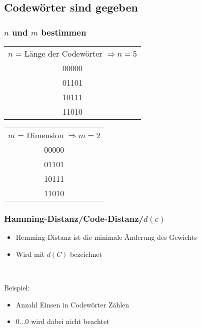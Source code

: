 \subsection{Codewörter sind gegeben}

\subsubsection*{$n$ und $m$ bestimmen}

\begin{table}[h]
\centering
\begin{tabular}{c}
$n$ = Länge der Codewörter $\Rightarrow n = 5$\\
{\color{blue}00000}\\
01101\\
10111\\
11010\\
\end{tabular}
\end{table}


\begin{table}[h]
\centering
\begin{tabular}{c}
$m$ = Dimension $\Rightarrow m = 2$\\
{\color{blue}00}000\\
{\color{blue}01}101\\
{\color{blue}10}111\\
{\color{blue}11}010\\
\end{tabular}
\end{table}

\subsubsection*{Hamming-Distanz/Code-Distanz/$d(c)$}

\begin{itemize}
\item Hemming-Distanz ist die minimale Änderung des Gewichts
\item Wird mit $d(C)$ bezeichnet
\end{itemize}\

Beispiel:

\begin{itemize}
\item Anzahl Einsen in Codewörter Zählen
\item $0 \dots 0$ wird dabei nicht beachtet
\end{itemize}

